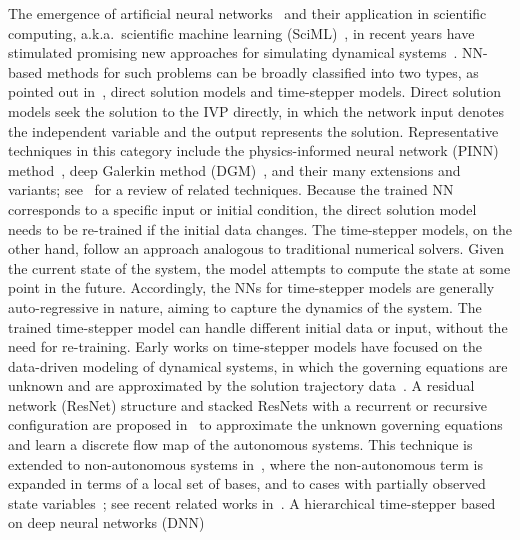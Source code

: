 The emergence of artificial neural networks~\cite{GoodfellowBC2016} and their application
in scientific computing, a.k.a.~scientific machine
learning (SciML)~\cite{Karniadakisetal2021,RaissiPK2019,SirignanoS2018,EY2018,TangWL2021,DongN2021,KrishnapriyanGZKM2021,DongY2022,WanW2020,Penwardenetal2023,QianZHD2023},
in recent years
have stimulated promising new approaches
for simulating dynamical systems~\cite{QinWX2019,RaissiPK2019,SirignanoS2018,Jietal2021,LiuKB2022,WangP2023,FlamantPS2020,Dellnitzetal2023,MoyaL2023}.
%
NN-based methods for such problems can be broadly classified into two types,
as pointed out in~\cite{Legaardetal2023}, direct solution models
and time-stepper models. Direct solution models seek the solution to the IVP
directly, in which the network input denotes the independent variable and
the output represents the solution. Representative techniques in
this category include the physics-informed neural network (PINN)
method~\cite{RaissiPK2019}, deep Galerkin method (DGM)~\cite{SirignanoS2018},
and their many extensions and variants; see~\cite{Karniadakisetal2021,Cuomo2022Scientific}
for a review of related techniques.
Because the trained NN corresponds to a specific input or initial
condition, the direct solution  model needs to be re-trained
if the initial data changes. 
The time-stepper models, on the other hand, follow an approach
analogous to traditional numerical solvers. Given the current state of
the system, the model attempts to compute the state at some point
in the future. Accordingly, the NNs for time-stepper models
are generally auto-regressive in nature, aiming to capture
the dynamics of the system. The trained time-stepper model can
handle different initial data or input, without the need for re-training.
Early works on time-stepper models have focused on the
data-driven modeling of dynamical systems, in which
the governing equations are
unknown and are approximated by the solution
trajectory data~\cite{QinWX2019,QinCJX2021,ChurchillX2022}.
A residual network (ResNet) structure and stacked ResNets with
a recurrent or recursive configuration
are proposed in~\cite{QinWX2019} to approximate the unknown governing
equations and learn a discrete flow map of the autonomous systems.
This technique is extended to non-autonomous systems in~\cite{QinCJX2021},
where the non-autonomous term is expanded in terms of a local set of bases,
and to cases with partially observed  state
variables~\cite{ChurchillX2022}; see recent related works
in~\cite{ChenW2023,LuT2024}.
A hierarchical time-stepper based on deep neural networks (DNN)
